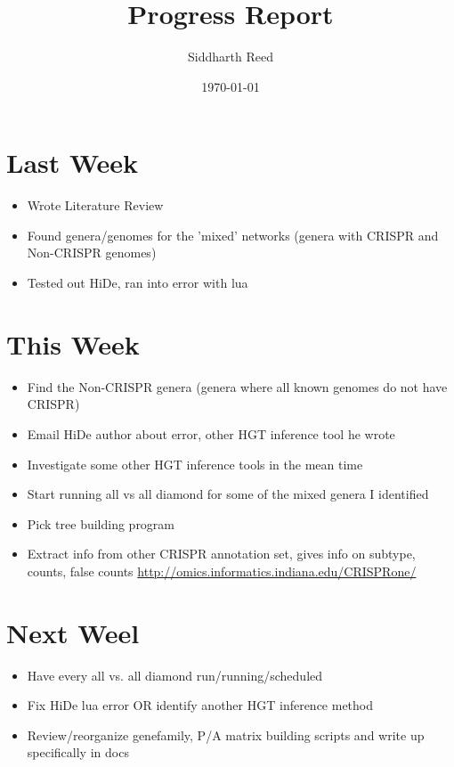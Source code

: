 \documentclass[10pt,letter]{article}
\title{Progress Report}
\author{Siddharth Reed}
\date{\today}
\begin{document}
\maketitle

\section*{Last Week}
\begin{itemize}
    \item Wrote Literature Review
    \item Found genera/genomes for the 'mixed' networks (genera with CRISPR and Non-CRISPR genomes)
    \item Tested out HiDe, ran into error with lua
\end{itemize}

\section*{This Week}
\begin{itemize}
    \item Find the Non-CRISPR genera (genera where all known genomes do not have CRISPR)
    \item Email HiDe author about error, other HGT inference tool he wrote
    \item Investigate some other HGT inference tools in the mean time
    \item Start running all vs all diamond for some of the mixed genera I identified
    \item Pick tree building program
    \item Extract info from other CRISPR annotation set, gives info on subtype, counts, false counts \url{http://omics.informatics.indiana.edu/CRISPRone/}
\end{itemize}

\section*{Next Weel}
\begin{itemize}
    \item Have every all vs. all diamond run/running/scheduled
    \item Fix HiDe lua error OR identify another HGT inference method
    \item Review/reorganize genefamily, P/A matrix building scripts and write up specifically in docs
\end{itemize}
\end{document}
